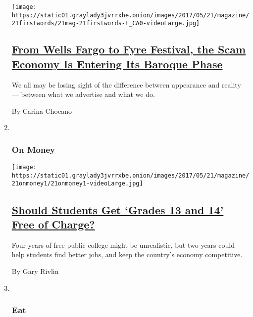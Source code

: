 \begin{enumerate}
  \texttt{[image: https://static01.graylady3jvrrxbe.onion/images/2017/05/21/magazine/21firstwords/21mag-21firstwords-t\_CA0-videoLarge.jpg]}

  \hypertarget{from-wells-fargo-to-fyre-festival-the-scam-economy-is-entering-its-baroque-phase}{%
  \subsection{\texorpdfstring{\href{/2017/05/16/magazine/from-wells-fargo-to-fyre-festival-the-scam-economy-is-entering-its-baroque-phase.html}{From
  Wells Fargo to Fyre Festival, the Scam Economy Is Entering Its Baroque
  Phase}}{From Wells Fargo to Fyre Festival, the Scam Economy Is Entering Its Baroque Phase}}\label{from-wells-fargo-to-fyre-festival-the-scam-economy-is-entering-its-baroque-phase}}

  We all may be losing sight of the difference between appearance and
  reality --- between what we advertise and what we do.

  By Carina Chocano
\item ~
  \hypertarget{on-money}{%
  \subsubsection{On Money}\label{on-money}}

  \texttt{[image: https://static01.graylady3jvrrxbe.onion/images/2017/05/21/magazine/21onmoney1/21onmoney1-videoLarge.jpg]}

  \hypertarget{should-students-get-grades-13-and-14-free-of-charge}{%
  \subsection{\texorpdfstring{\href{/2017/05/16/magazine/should-students-get-grades-13-and-14-free-of-charge.html}{Should
  Students Get `Grades 13 and 14' Free of
  Charge?}}{Should Students Get `Grades 13 and 14' Free of Charge?}}\label{should-students-get-grades-13-and-14-free-of-charge}}

  Four years of free public college might be unrealistic, but two years
  could help students find better jobs, and keep the country's economy
  competitive.

  By Gary Rivlin
\item ~
  \hypertarget{eat}{%
  \subsubsection{Eat}\label{eat}}


\end{enumerate}
